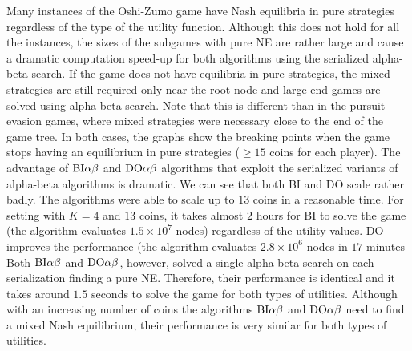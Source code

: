 Many instances of the Oshi-Zumo game have Nash equilibria in pure strategies regardless of the type of the utility function.
Although this does not hold for all the instances, the sizes of the subgames with pure NE are rather large and cause a dramatic computation speed-up for both algorithms using the serialized alpha-beta search.
If the game does not have equilibria in pure strategies, the mixed strategies are still required only near the root node and large end-games are solved using alpha-beta search.
Note that this is different than in the pursuit-evasion games, where mixed strategies were necessary close to the end of the game tree.
In both cases, the graphs show the breaking points when the game stops having an equilibrium in pure strategies ($\ge 15$ coins for each player).
The advantage of $\textrm{BI}\alpha\beta$ and $\textrm{DO}\alpha\beta$ algorithms that exploit the serialized variants of alpha-beta algorithms is dramatic.
We can see that both \textsc{BI} and \textsc{DO} scale rather badly.
The algorithms were able to scale up to $13$ coins in a reasonable time.
For setting with $K=4$ and $13$ coins, it takes almost $2$ hours for \textsc{BI} to solve the game (the algorithm evaluates $1.5\times10^7$ nodes) regardless of the utility values.
\textsc{DO} improves the performance (the algorithm evaluates $2.8\times10^6$ nodes in $17$ minutes 
Both $\textrm{BI}\alpha\beta$ and $\textrm{DO}\alpha\beta$, however, solved a single alpha-beta search on each serialization finding a pure NE.
Therefore, their performance is identical and it takes around $1.5$ seconds to solve the game for both types of utilities.
Although with an increasing number of coins the algorithms $\textrm{BI}\alpha\beta$ and $\textrm{DO}\alpha\beta$ need to find a mixed Nash equilibrium, their performance is very similar for both types of utilities.

